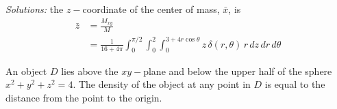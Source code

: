 \begin{parts}
    \ifnum {} {\color{DarkBlue} \textit{Solutions:} the $z-$coordinate of the center of mass, $\bar x$, is
    \begin{align}
    \bar z &= \frac{M_{xy}}{M} \\
    &= \frac{1}{16 +4\pi} \int_0^{\pi/2} \int_0^2 \int_0^{3+4r\cos\theta}  z \, \delta(r,\theta) \, r\, dz\,dr\,d\theta
    \end{align}
    } 
    \else
      
    \fi
    \end{parts} 
    
\fi


\ifnum {}
\question[6] An object $D$ lies above the $xy-$plane and below the upper half of the sphere $x^2+y^2 + z^2 = 4$. The density of the object at any point in $D$ is equal to the distance from the point to the origin. 

